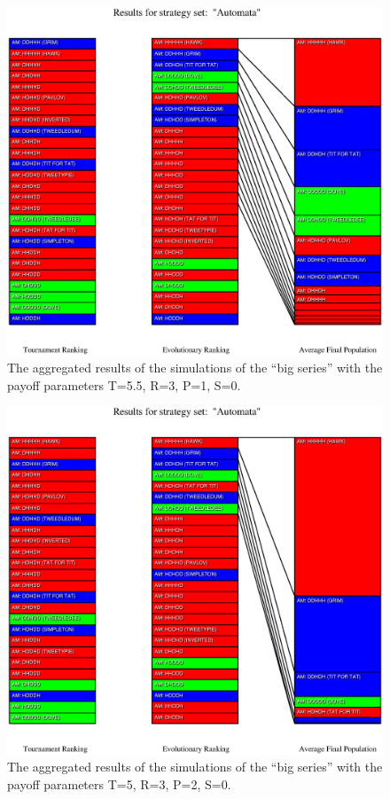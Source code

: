 \begin{figure}
\begin{center}
\includegraphics[width=20cm]{tables/Automata_P5.5.eps}
\caption{\label{Automata_P55} The aggregated results of the
simulations of the ``big series'' with the payoff parameters T=5.5, R=3, P=1,
S=0.}
\end{center}
\end{figure}

\begin{figure}
\begin{center}
\includegraphics[width=20cm]{tables/Automata_P2.eps}
\caption{\label{Automata_P2}The aggregated results of the
simulations of the ``big series'' with the payoff parameters T=5, R=3, P=2,
S=0.}
\end{center}
\end{figure}


